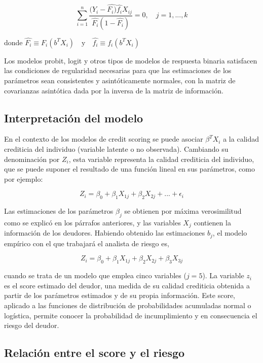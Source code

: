 \documentclass[
  12pt,
]{krantz}
\theoremstyle{definition}
\theoremstyle{definition}
\theoremstyle{definition}
\theoremstyle{remark}
\begin{document}
\[\sum_{i=1}^n\frac{(Y_i-\hat{F_i)}\hat{f_i}X_{ij}}{\hat{F_i}(1-\hat{F_i})}=0,\quad j=1,...,k
\label{eq:ecuacion13}\]

donde \(\hat{F_i}\equiv F_i(b^TX_i) \quad \textrm{y} \quad \hat{f_i}\equiv f_i(b^TX_i)\)

Los modelos probit, logit y otros tipos de modelos de respuesta binaria satisfacen las condiciones de regularidad necesarias para que las estimaciones de los parámetros sean consistentes y asintóticamente normales, con la matriz de covarianzas asintótica dada por la inversa de la matriz de información.

\hypertarget{interpretacion-del-modelo}{%
\subsection{Interpretación del modelo}\label{interpretacion-del-modelo}}

En el contexto de los modelos de credit scoring se puede asociar \(\beta^TX_i\) a la calidad crediticia del individuo (variable latente o no observada). Cambiando su denominación por \(Z_i\), esta variable representa la calidad crediticia del individuo, que se puede suponer el resultado de una función lineal en sus parámetros, como por ejemplo:

\[Z_i=\beta_0+\beta_1X_{1j}+\beta_2X_{2j}+...+\epsilon_i
\label{eq:ecuacion14}\]

Las estimaciones de los parámetros \(\beta_j\) se obtienen por máxima verosimilitud como se explicó en los párrafos anteriores, y las variables \(X_j\) contienen la información de los deudores. Habiendo obtenido las estimaciones \(b_j\), el modelo empírico con el que trabajará el analista de riesgo es,

\[Z_i=\beta_0+\beta_1X_{1j}+\beta_2X_{2j}+\beta_3X_{3j}
\label{eq:ecuacion15}\]

cuando se trata de un modelo que emplea cinco variables (\(j=5\)). La variable \(z_i\) es el score estimado del deudor, una medida de su calidad crediticia obtenida a partir de los parámetros estimados y de su propia información. Este score, aplicado a las funciones de distribución de probabilidades acumuladas normal o logística, permite conocer la probabilidad de incumplimiento y en consecuencia el riesgo del deudor.

\hypertarget{relacion-entre-el-score-y-el-riesgo}{%
\subsection{Relación entre el score y el riesgo}\label{relacion-entre-el-score-y-el-riesgo}}
\end{document}
